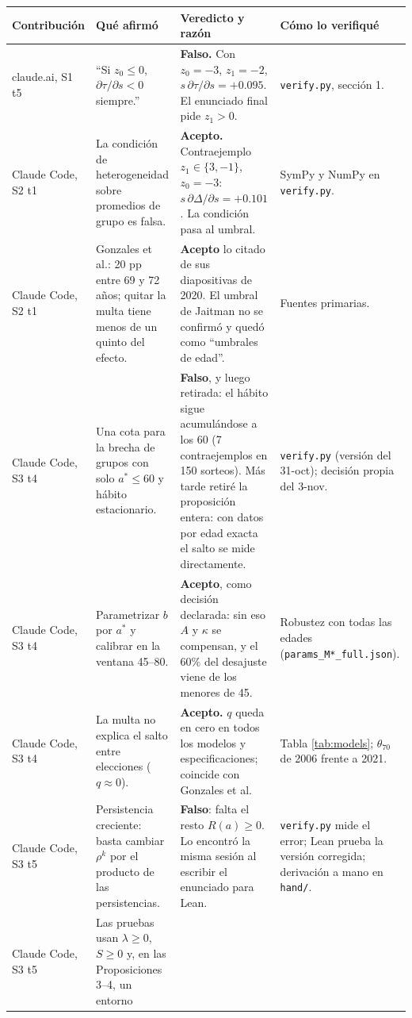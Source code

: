 \documentclass[11pt]{article}
\theoremstyle{definition}
\newcommand{\1}{\mathbbm{1}}
\begin{document}
\begin{center}\small
\begin{tabular}{p{2.2cm}p{4.1cm}p{4.3cm}p{3.9cm}}
\toprule
Contribución & Qué afirmó & Veredicto y razón & Cómo lo verifiqué \\
\midrule
claude.ai, S1 t5 & ``Si $z_0\le0$, $\partial\tau/\partial s<0$ siempre.'' & \textbf{Falso.} Con
$z_0=-3$, $z_1=-2$, $s\,\partial\tau/\partial s=+0.095$. El enunciado final pide $z_1>0$. &
\texttt{verify.py}, sección 1. \\
Claude Code, S2 t1 & La condición de heterogeneidad sobre promedios de grupo es falsa. & \textbf{Acepto.}
Contraejemplo $z_1\in\{3,-1\}$, $z_0=-3$: $s\,\partial\Delta/\partial s=+0.101$. La condición pasa
al umbral. & SymPy y NumPy en \texttt{verify.py}. \\
Claude Code, S2 t1 & Gonzales et al.: 20 pp entre 69 y 72 años; quitar la multa tiene menos de un
quinto del efecto. & \textbf{Acepto} lo citado de sus diapositivas de 2020. El umbral de Jaitman
no se confirmó y quedó como ``umbrales de edad''. & Fuentes primarias. \\
Claude Code, S3 t4 & Una cota para la brecha de grupos con solo $a^*\le60$ y hábito estacionario. &
\textbf{Falso}, y luego retirada: el hábito sigue acumulándose a los 60 (7 contraejemplos en 150
sorteos). Más tarde retiré la proposición entera: con datos por edad exacta el salto se mide
directamente. & \texttt{verify.py} (versión del 31-oct); decisión propia del 3-nov. \\
Claude Code, S3 t4 & Parametrizar $b$ por $a^*$ y calibrar en la ventana 45--80. & \textbf{Acepto},
como decisión declarada: sin eso $A$ y $\kappa$ se compensan, y el 60\% del desajuste viene de los
menores de 45. & Robustez con todas las edades (\texttt{params\_M*\_full.json}). \\
Claude Code, S3 t4 & La multa no explica el salto entre elecciones ($q\approx0$). & \textbf{Acepto.}
$q$ queda en cero en todos los modelos y especificaciones; coincide con Gonzales et al. & Tabla
\ref{tab:models}; $\theta_{70}$ de 2006 frente a 2021. \\
Claude Code, S3 t5 & Persistencia creciente: basta cambiar $\rho^k$ por el producto de las
persistencias. & \textbf{Falso}: falta el resto $R(a)\ge0$. Lo encontró la misma sesión al escribir
el enunciado para Lean. & \texttt{verify.py} mide el error; Lean prueba la versión corregida;
derivación a mano en \texttt{hand/}. \\
Claude Code, S3 t5 & Las pruebas usan $\lambda\ge0$, $S\ge0$ y, en las Proposiciones 3--4, un entorno

\end{tabular}
\end{center}
\end{document}
